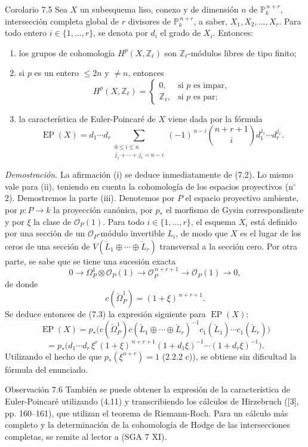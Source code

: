 \begin{statement}{Corolario 7.5}
Sea $X$ un subesquema liso, conexo y de dimensión $n$ de $\mathbb P_k^{\,n+r}$, intersección completa global de $r$ divisores de $\mathbb P_k^{\,n+r}$, a saber, $X_1,X_2,\ldots,X_r$. Para todo entero $i\in\{1,\ldots,r\}$, se denota por $d_i$ el grado de $X_i$. Entonces:
\begin{enumerate}[label=(\roman*)]
\item los grupos de cohomología $H^p(X,\mathbb Z_\ell)$ son $\mathbb Z_\ell$-módulos libres de tipo finito;
\item si $p$ es un entero $\le 2n$ y $\ne n$, entonces
\[
H^p(X,\mathbb Z_\ell)=
\begin{cases}
0,&\text{si }p\text{ es impar},\\
\mathbb Z_\ell,&\text{si }p\text{ es par};
\end{cases}
\]
\item la característica de Euler-Poincaré de $X$ viene dada por la fórmula
\[
\operatorname{EP}(X)
=d_1\cdots d_r
\sum_{\substack{0\le i\le n\\ j_1+\cdots+j_r=n-i}}
(-1)^{\,n-i}\binom{n+r+1}{i}
d_1^{j_1}\cdots d_r^{j_r}.
\]
\end{enumerate}
\end{statement}

\emph{Demostración.} La afirmación (i) se deduce inmediatamente de (7.2). Lo mismo vale para (ii), teniendo en cuenta la cohomología de los espacios proyectivos (n$^\circ$ 2). Demostremos la parte (iii). Denotemos por $P$ el espacio proyectivo ambiente, por $p:P\to k$ la proyección canónica, por $p_*$ el morfismo de Gysin correspondiente y por $\xi$ la clase de $\mathcal O_P(1)$. Para todo $i\in\{1,\ldots,r\}$, el esquema $X_i$ está definido por una sección de un $\mathcal O_P$-módulo invertible $L_i$, de modo que $X$ es el lugar de los ceros de una sección de $V(\check L_1\oplus\cdots\oplus\check L_r)$ transversal a la sección cero. Por otra parte, se sabe que se tiene una sucesión exacta
\[
0\to\Omega_P^1\otimes\mathcal O_P(1)\to\mathcal O_P^{\,n+r+1}\to\mathcal O_P(1)\to0,
\]
de donde
\[
c(\check\Omega_P^1)=(1+\xi)^{\,n+r+1}.
\]
Se deduce entonces de (7.3) la expresión siguiente para $\operatorname{EP}(X)$:
\[
\operatorname{EP}(X)
=p_*\bigl(c(\check\Omega_P^1)c(\check L_1\oplus\cdots\oplus\check L_r)^{-1}
c_1(\check L_1)\cdots c_1(\check L_r)\bigr)
\]
\[
=p_*\bigl(d_1\cdots d_r\,\xi^r(1+\xi)^{\,n+r+1}
(1+d_1\xi)^{-1}\cdots(1+d_r\xi)^{-1}\bigr).
\]
Utilizando el hecho de que $p_*(\xi^{n+r})=1$ (2.2.2 c)), se obtiene sin dificultad la fórmula del enunciado.

\begin{statement}{Observación 7.6}
También se puede obtener la expresión de la característica de Euler-Poincaré utilizando (4.11) y transcribiendo los cálculos de Hirzebruch ([3], pp. 160--161), que utilizan el teorema de Riemann-Roch. Para un cálculo más completo y la determinación de la cohomología de Hodge de las intersecciones completas, se remite al lector a (SGA 7 XI).
\end{statement}
